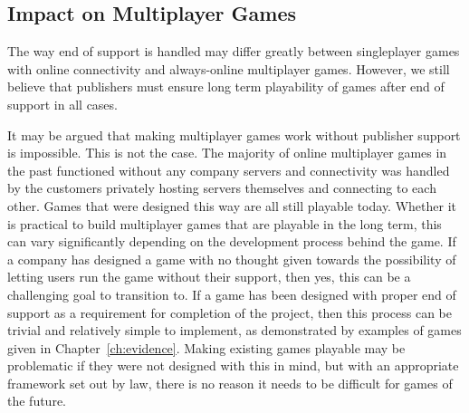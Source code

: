 

\subsection{Impact on Multiplayer Games}
The way end of support is handled may differ greatly between singleplayer games with online connectivity and always-online multiplayer games.
However, we still believe that publishers must ensure long term playability of games after end of support in all cases.

It may be argued that making multiplayer games work without publisher support is impossible.
This is not the case.
The majority of online multiplayer games in the past functioned without any company servers
and connectivity was handled by the customers privately hosting servers themselves and connecting to each other.
Games that were designed this way are all still playable today.
Whether it is practical to build multiplayer games that are playable in the long term, this can vary significantly depending on the development process behind the game.
If a company has designed a game with no thought given towards the possibility of letting users run the game without their support, then yes,
this can be a challenging goal to transition to.
If a game has been designed with proper end of support as a requirement for completion of the project, then this process can be trivial and relatively simple to implement,
as demonstrated by examples of games given in Chapter~\ref{ch:evidence}.
Making existing games playable may be problematic if they were not designed with this in mind,
but with an appropriate framework set out by law, there is no reason it needs to be difficult for games of the future.

